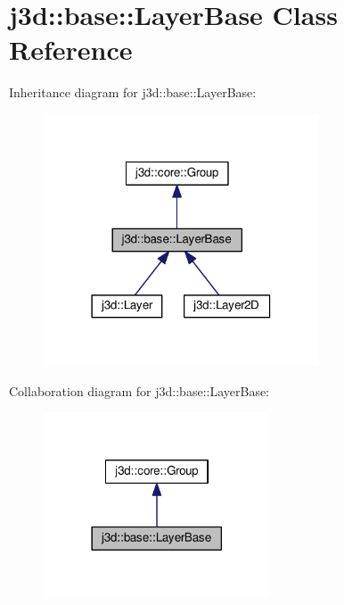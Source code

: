 \hypertarget{classj3d_1_1base_1_1LayerBase}{}\section{j3d\+:\+:base\+:\+:Layer\+Base Class Reference}
\label{classj3d_1_1base_1_1LayerBase}


Inheritance diagram for j3d\+:\+:base\+:\+:Layer\+Base\+:
\nopagebreak
\begin{figure}[H]
\begin{center}
\leavevmode
\includegraphics[width=230pt]{classj3d_1_1base_1_1LayerBase__inherit__graph}
\end{center}
\end{figure}


Collaboration diagram for j3d\+:\+:base\+:\+:Layer\+Base\+:
\nopagebreak
\begin{figure}[H]
\begin{center}
\leavevmode
\includegraphics[width=189pt]{classj3d_1_1base_1_1LayerBase__coll__graph}
\end{center}
\end{figure}
